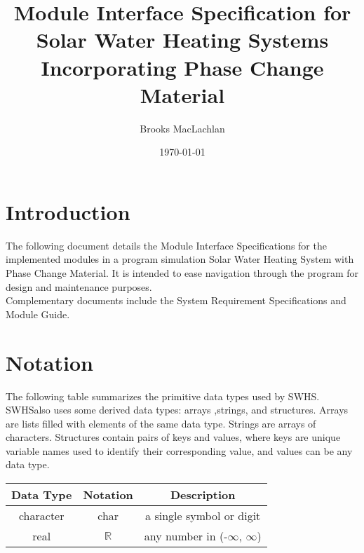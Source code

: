 \documentclass[12pt]{article}
\newcommand{\progname}{SWHS}
\begin{document}
\title{Module Interface Specification for Solar Water Heating Systems Incorporating Phase Change Material}
\author{Brooks MacLachlan}
\date{\today}

\maketitle

\tableofcontents

\section{Introduction}

The following document details the Module Interface Specifications for the implemented 
modules in a program simulation Solar Water Heating System with Phase Change Material.
It is intended to ease navigation through the program for design and maintenance purposes.\\
Complementary documents include the System Requirement Specifications and Module Guide. 

\section{Notation}

The following table summarizes the primitive data types used by \progname. \progname also uses some derived data types: arrays ,strings, and structures. Arrays are lists filled with elements of the same data type. Strings are arrays of characters. Structures contain pairs of keys and values, where keys are unique variable names used to identify their corresponding value, and values can be any data type.

\begin{center}
\renewcommand{\arraystretch}{1.2}
\noindent 
\begin{tabular}{c c c} 
\toprule 
\textbf{Data Type} & \textbf{Notation} & \textbf{Description}\\ 
\midrule
character & char & a single symbol or digit\\
real & $\mathbb{R}$ & any number in (-$\infty$, $\infty$)\\
\bottomrule
\end{tabular} 
\end{center}
\end{document}
